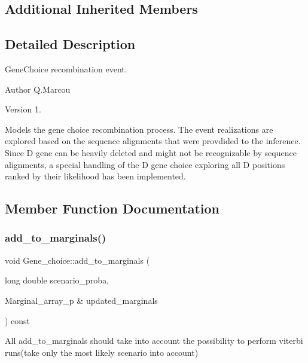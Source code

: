 \subsection*{Additional Inherited Members}


\subsection{Detailed Description}
Gene\+Choice recombination event. 

\begin{DoxyAuthor}{Author}
Q.\+Marcou 
\end{DoxyAuthor}
\begin{DoxyVersion}{Version}
1.
\end{DoxyVersion}
Models the gene choice recombination process. The event realizations are explored based on the sequence alignments that were provdided to the inference. Since D gene can be heavily deleted and might not be recognizable by sequence alignments, a special handling of the D gene choice exploring all D positions ranked by their likelihood has been implemented. 

\subsection{Member Function Documentation}
\mbox{\label{classGene__choice_ac1d61da5a319518f24af8da2e1e6435a}} 
\subsubsection{\texorpdfstring{add\+\_\+to\+\_\+marginals()}{add\_to\_marginals()}}
{\footnotesize\ttfamily void Gene\+\_\+choice\+::add\+\_\+to\+\_\+marginals (\begin{DoxyParamCaption}\item[{long double}]{scenario\+\_\+proba,  }\item[{Marginal\+\_\+array\+\_\+p \&}]{updated\+\_\+marginals }\end{DoxyParamCaption}) const\hspace{0.3cm}{\ttfamily [virtual]}}

All add\+\_\+to\+\_\+marginals should take into account the possibility to perform viterbi runs(take only the most likely scenario into account) 

